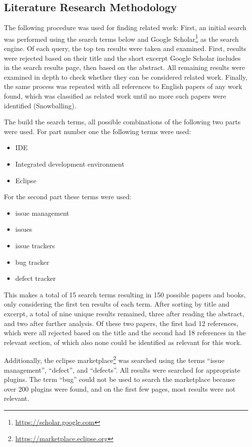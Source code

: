 \subsection{Literature Research Methodology} 
\label{ssec:ch2:ss2.1}
The following procedure was used for finding related work:
First, an initial search was performed using the search terms below and Google Scholar\footnote{\url{https://scholar.google.com}} as the search engine.
Of each query, the top ten results were taken and examined.
First, results were rejected based on their title and the short excerpt Google Scholar includes in the search results page, 
then based on the abstract.
All remaining results were examined in depth to check whether they can be considered related work.
Finally, the same process was repeated with all references to English papers of any work found, 
which was classified as related work until no more such papers were identified (Snowballing).

The build the search terms, all possible combinations of the following two parts were used.
For part number one the following terms were used:
\begin{itemize}
	\item IDE
	\item Integrated development environment
	\item Eclipse
\end{itemize}

For the second part these terms were used:

\begin{itemize}
	\item issue management
	\item issues
	\item issue trackers
	\item bug tracker
	\item defect tracker
\end{itemize}

This makes a total of 15 search terms resulting in 150 possible papers and books, only considering the first ten results of each term.
After sorting by title and excerpt, a total of nine unique results remained, three after reading the abstract, and two after further analysis.
Of these two papers, the first had 12 references, which were all rejected based on the title and the second had 18 references in the relevant section, of which also none could be identified as relevant for this work.

Additionally, the eclipse marketplace\footnote{\url{https://marketplace.eclipse.org}} was searched using the terms ``issue management'', ``defect'', and ``defects''. 
All results were searched for appropriate plugins.
The term ``bug'' could not be used to search the marketplace because over 200 plugins were found, and on the first few pages, most results were not relevant.

